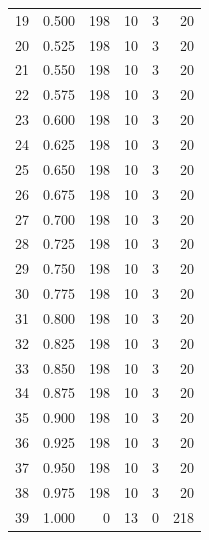 \documentclass[a4paper,twoside,12pt]{book}
\begin{document}
\begin{appendices}
\begin{table}
\begin{tabular}{lrrrrr}
		19 &  0.500 &       198 &        10 &               3 &              20 \\
		20 &  0.525 &       198 &        10 &               3 &              20 \\
		21 &  0.550 &       198 &        10 &               3 &              20 \\
		22 &  0.575 &       198 &        10 &               3 &              20 \\
		23 &  0.600 &       198 &        10 &               3 &              20 \\
		24 &  0.625 &       198 &        10 &               3 &              20 \\
		25 &  0.650 &       198 &        10 &               3 &              20 \\
		26 &  0.675 &       198 &        10 &               3 &              20 \\
		27 &  0.700 &       198 &        10 &               3 &              20 \\
		28 &  0.725 &       198 &        10 &               3 &              20 \\
		29 &  0.750 &       198 &        10 &               3 &              20 \\
		30 &  0.775 &       198 &        10 &               3 &              20 \\
		31 &  0.800 &       198 &        10 &               3 &              20 \\
		32 &  0.825 &       198 &        10 &               3 &              20 \\
		33 &  0.850 &       198 &        10 &               3 &              20 \\
		34 &  0.875 &       198 &        10 &               3 &              20 \\
		35 &  0.900 &       198 &        10 &               3 &              20 \\
		36 &  0.925 &       198 &        10 &               3 &              20 \\
		37 &  0.950 &       198 &        10 &               3 &              20 \\
		38 &  0.975 &       198 &        10 &               3 &              20 \\
		39 &  1.000 &         0 &        13 &               0 &             218 \\
		\bottomrule
	\end{tabular}				
\end{table}


\end{appendices}
\end{document}
